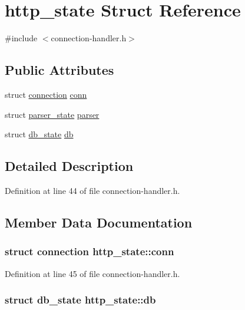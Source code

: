 \hypertarget{structhttp__state}{\section{http\-\_\-state Struct Reference}
\label{structhttp__state}
}


{\ttfamily \#include $<$connection-\/handler.\-h$>$}

\subsection*{Public Attributes}
\begin{DoxyCompactItemize}
\item 
struct \hyperlink{structconnection}{connection} \hyperlink{structhttp__state_af220a1e33cf7177d4d4ca101a46547ec}{conn}
\item 
struct \hyperlink{structparser__state}{parser\-\_\-state} \hyperlink{structhttp__state_a3eda42ab7c2b2dfbc61a1cc5eb076555}{parser}
\item 
struct \hyperlink{structdb__state}{db\-\_\-state} \hyperlink{structhttp__state_a7b27d01030cc535f0cfe1254f452f243}{db}
\end{DoxyCompactItemize}


\subsection{Detailed Description}


Definition at line 44 of file connection-\/handler.\-h.



\subsection{Member Data Documentation}
\hypertarget{structhttp__state_af220a1e33cf7177d4d4ca101a46547ec}{
\subsubsection[{conn}]{\setlength{\rightskip}{0pt plus 5cm}struct {\bf connection} http\-\_\-state\-::conn}}\label{structhttp__state_af220a1e33cf7177d4d4ca101a46547ec}


Definition at line 45 of file connection-\/handler.\-h.

\hypertarget{structhttp__state_a7b27d01030cc535f0cfe1254f452f243}{
\subsubsection[{db}]{\setlength{\rightskip}{0pt plus 5cm}struct {\bf db\-\_\-state} http\-\_\-state\-::db}}\label{structhttp__state_a7b27d01030cc535f0cfe1254f452f243}


